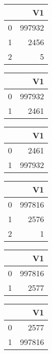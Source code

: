 \bigskip\bigskip
\centering
\begin{tabular}{rr}
  \hline
 & V1 \\ 
  \hline
0 & 997932 \\ 
  1 & 2456 \\ 
  2 &   5 \\ 
   \hline
\end{tabular}

\bigskip\bigskip
\centering
\begin{tabular}{rr}
  \hline
 & V1 \\ 
  \hline
0 & 997932 \\ 
  1 & 2461 \\ 
   \hline
\end{tabular}

\bigskip\bigskip
\centering
\begin{tabular}{rr}
  \hline
 & V1 \\ 
  \hline
0 & 2461 \\ 
  1 & 997932 \\ 
   \hline
\end{tabular}

\bigskip\bigskip
\centering
\begin{tabular}{rr}
  \hline
 & V1 \\ 
  \hline
0 & 997816 \\ 
  1 & 2576 \\ 
  2 &   1 \\ 
   \hline
\end{tabular}

\bigskip\bigskip
\centering
\begin{tabular}{rr}
  \hline
 & V1 \\ 
  \hline
0 & 997816 \\ 
  1 & 2577 \\ 
   \hline
\end{tabular}

\bigskip\bigskip
\centering
\begin{tabular}{rr}
  \hline
 & V1 \\ 
  \hline
0 & 2577 \\ 
  1 & 997816 \\ 
   \hline
\end{tabular}

